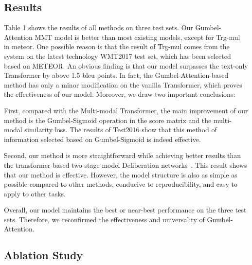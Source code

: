 \documentclass[11pt]{article}
\begin{document}
\subsection{Results}

Table 1 shows the results of all methods on three test sets. Our Gumbel-Attention MMT model is better than most existing models, except for Trg-mul~\citep{DBLP:conf/wmt/CaglayanABGBBMH17} in meteor. One possible reason is that the result of Trg-mul comes from the system on the latest technology WMT2017 test set, which has been selected based on METEOR. An obvious finding is that our model surpasses the text-only Transformer by above 1.5 bleu points. In fact, the Gumbel-Attention-based method has only a minor modification on the vanilla Transformer, which proves the effectiveness of our model. Moreover, we draw two important conclusions:



First, compared with the Multi-modal Transformer, the main improvement of our method is the Gumbel-Sigmoid operation in the score matrix and the multi-modal similarity loss. The results of Test2016 show that this method of information selected based on Gumbel-Sigmoid is indeed effective.  


Second, our method is more straightforward while achieving better results than the transformer-based two-stage model Deliberation networks~\citep{DBLP:conf/acl/IveMS19}. This result shows that our method is effective. However, the model structure is also as simple as possible compared to other methods, conducive to reproducibility, and easy to apply to other tasks.

Overall, our model maintains the best or near-best performance on the three test sets. Therefore, we reconfirmed the effectiveness and universality of Gumbel-Attention.




\subsection{Ablation Study}

\begin{table}
\centering
{}
\caption{Ablation study of our model on Test2016}
\label{tab:plain}
\end{table}
\end{document}
